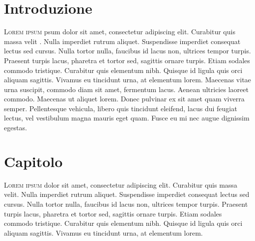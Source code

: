 \documentclass[a4paper, 11pt, oneside]{book}
\begin{document}


\tableofcontents

\clearpage
\sloppy
{}


\frenchspacing  %



\chapter{Introduzione}\label{ch:intro}

\vspace{10mm}


 \vspace{5mm}
 
\lettrine[lines=2, depth=0, lraise=-0.1, findent=0.3em, nindent=0.3em]{\color{BrickRed}\fontsize{50pt}{72pt}L}{orem ipsum} psum dolor sit amet, consectetur adipiscing elit. Curabitur quis massa velit \cite{10.2307/43707814}. Nulla imperdiet rutrum aliquet. Suspendisse imperdiet consequat lectus sed cursus. Nulla tortor nulla, faucibus id lacus non, ultrices tempor turpis. Praesent turpis lacus, pharetra et tortor sed, sagittis ornare turpis. Etiam sodales commodo tristique. Curabitur quis elementum nibh. Quisque id ligula quis orci aliquam sagittis. Vivamus eu tincidunt urna, at elementum lorem. Maecenas vitae urna suscipit, commodo diam sit amet, fermentum lacus. Aenean ultricies laoreet commodo. Maecenas ut aliquet lorem. Donec pulvinar ex sit amet quam viverra semper. Pellentesque vehicula, libero quis tincidunt eleifend, lacus dui feugiat lectus, vel vestibulum magna mauris eget quam. Fusce eu mi nec augue dignissim egestas. 

\chapter{Capitolo}\label{ch:1}

\lettrine[lines=2, depth=0, lraise=-0.1, findent=0.3em, nindent=0.3em]{\color{BrickRed}\fontsize{50pt}{72pt}L}{orem ipsum} dolor sit amet, consectetur adipiscing elit. Curabitur quis massa velit. Nulla imperdiet rutrum aliquet. Suspendisse imperdiet consequat lectus sed cursus. Nulla tortor nulla, faucibus id lacus non, ultrices tempor turpis. Praesent turpis lacus, pharetra et tortor sed, sagittis ornare turpis. Etiam sodales commodo tristique. Curabitur quis elementum nibh. Quisque id ligula quis orci aliquam sagittis. Vivamus eu tincidunt urna, at elementum lorem.
\end{document}
